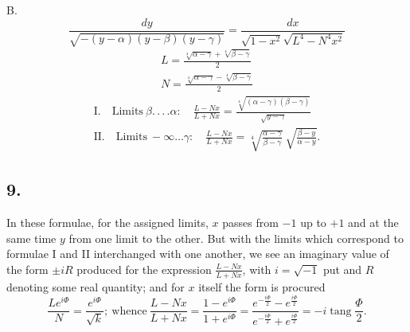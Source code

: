 \documentclass{article}
\begin{document}
B.
\[
\frac{dy}{\sqrt{-(y-\alpha)(y-\beta)(y-\gamma)}}=\frac{dx}{\sqrt{1-x^{2}}\sqrt{L^{4}-N^{4}x^{2}}}
\]
\[
\begin{gathered}
L=\frac{\sqrt[4]{\alpha-\gamma}+\sqrt[4]{\beta-\gamma}}{2}\\
N=\frac{\sqrt[4]{\alpha-\gamma}-\sqrt[4]{\beta-\gamma}}{2}
\end{gathered}
\]
\[
\begin{gathered}
\text{I.}\quad\text{Limits}\ \beta.\,.\,.\,.\alpha:\quad\frac{L-Nx}{L+Nx}=\frac{\sqrt[4]{(\alpha-\gamma)(\beta-\gamma)}}{\sqrt{y-\gamma}}\\
\text{II.}\quad\text{Limits}\ -\infty\ldots\gamma:\quad\frac{L-Nx}{L+Nx}=\sqrt[4]{\frac{\alpha-\gamma}{\beta-\gamma}}\ \sqrt{\frac{\beta-y}{\alpha-y}}.
\end{gathered}
\]


\subsection*{9.}

In these formulae, for the assigned limits, $x$ passes from $-1$ up to $+1$ and at the same time $y$ from one limit to the other. But with the limits which correspond to formulae I and II interchanged with one another, we see an imaginary value of the form $\pm iR$ produced for the expression $\frac{L-Nx}{L+Nx}$, with $i=\sqrt{-1}$ put and $R$ denoting some real quantity; and for $x$ itself the form is procured
\[
\frac{Le^{i\Phi}}{N}=\frac{e^{i\Phi}}{\sqrt{k}};\ \text{whence}\ \frac{L-Nx}{L+Nx}=\frac{1-e^{i\Phi}}{1+e^{i\Phi}}=\frac{e^{-\frac{i\Phi}{2}}-e^{\frac{i\Phi}{2}}}{e^{-\frac{i\Phi}{2}}+e^{\frac{i\Phi}{2}}}=-i\operatorname{tang}\frac{\Phi}{2}.
\]
\end{document}
